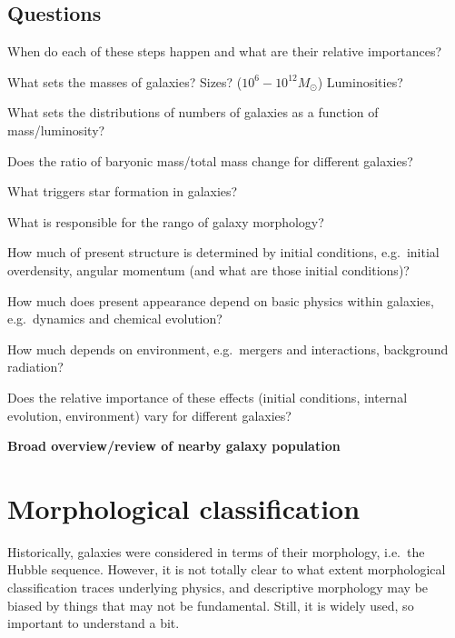\documentclass[12pt]{article}
\begin{document}
\subsection*{Questions}
\begin{itemize*}
    \item When do each of these steps happen and what are their
        relative importances?
    \item What sets the masses of galaxies? Sizes?
        ($10^6-10^{12}M_\odot$) Luminosities?
    \item What sets the distributions of numbers of galaxies as a
        function of mass/luminosity?
    \item Does the ratio of baryonic mass/total mass change for
        different galaxies?
    \item What triggers star formation in galaxies?
    \item What is responsible for the rango of galaxy morphology?
    \item How much of present structure is determined by initial
        conditions, e.g.\ initial overdensity, angular momentum (and what
        are those initial conditions)?
    \item How much does present appearance depend on basic physics
        within galaxies, e.g.\ dynamics and chemical evolution?
    \item How much depends on environment, e.g.\ mergers and
        interactions, background radiation?
    \item Does the relative importance of these effects (initial
        conditions, internal evolution, environment) vary for different
        galaxies?
\end{itemize*}
\newpage
\begin{centering}
    \begin{raggedright}
    {\LARGE\textbf{Broad overview/review of nearby galaxy population}}
    \end{raggedright}
\end{centering}
\section*{Morphological classification}
Historically, galaxies were considered in terms of their morphology,
i.e.\ the Hubble sequence.
However, it is not totally clear to what extent morphological classification
traces underlying physics, and descriptive morphology may be biased by things
that may not be fundamental.
Still, it is widely used, so important to understand a bit.
\end{document}
